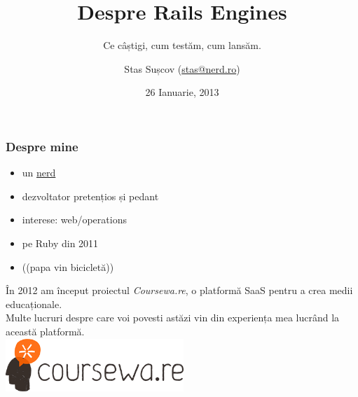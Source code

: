 \documentclass[compress]{beamer}
\title{Despre Rails Engines}
\subtitle{Ce câștigi, cum testăm, cum lansăm.}
\author{Stas Sușcov (\href{mailto:stas@nerd.ro}{stas@nerd.ro})}
\date{26 Ianuarie, 2013}
\institute{GeekMeet \#14, Cluj-Napoca, Transilvania}
\begin{document}
\maketitle

\begin{frame}
\frametitle{Despre mine}

\begin{itemize}[<+->]
  \item un \href{http://stas.nerd.ro}{nerd}
  \item dezvoltator pretențios și pedant
  \item interese: web/operations
  \item pe Ruby din 2011
  \item (\Heart (papa vin bicicletă))
\end{itemize}
\end{frame}

\begin{frame}
  \begin{center}
    \huge În 2012 am început proiectul \emph{Coursewa.re}, o platformă SaaS pentru a crea medii educaționale.
    \\
    \small Multe lucruri despre care voi povesti astăzi vin din experiența mea lucrând la această platformă.
    \\
    \colorbox{solarizedBase3}{\includegraphics[height=2cm]{courseware.png}}
  \end{center}
\end{frame}
\end{document}
